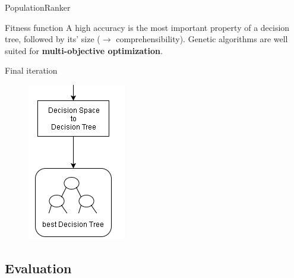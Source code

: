 \documentclass[english]{beamer}
\begin{document}
\begin{frame}{PopulationRanker}
	\begin{block}{Fitness function}
		A high accuracy is the most important property of a decision tree, followed by its' size ($\rightarrow$ comprehensibility). Genetic algorithms are well suited for \textbf{multi-objective optimization}.
	\end{block}
\end{frame}

{
\begin{frame}{Final iteration}
	\vspace{-1em}
	\begin{figure}
		\centering
		\includegraphics[scale=1]{figures/final_iteration.png}
	\end{figure}
\end{frame} }

\subsection*{Evaluation}
\end{document}
